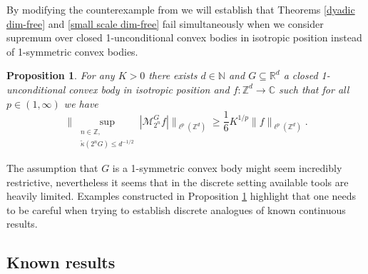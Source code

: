 \documentclass[10pt,a4paper]{amsart}
\numberwithin{equation}{section}
\newtheorem{Prop}[Thm]{Proposition}
\newcommand{\Z}{\mathbb{Z}}
\newcommand{\R}{\mathbb{R}}
\newcommand{\C}{\mathbb{C}}
\newcommand{\N}{\mathbb{N}}
\begin{document}
By modifying the counterexample from \cite[Theorem 2]{cubes} we will establish that Theorems \ref{dyadic dim-free} and \ref{small scale dim-free} fail simultaneously when we consider supremum over closed 1-unconditional convex bodies in isotropic position instead of 1-symmetric convex bodies.
\begin{Prop} \label{counter-example}
    For any $K >0$ there exists $d \in \N$ and $G \subseteq \R^d$ a closed 1-unconditional convex body in isotropic position and $f: \Z^d \to \C$ such that for all $p \in (1, \infty)$ we have
    \[
    \Big\| \sup_{\substack{n \in \Z, \\ \widetilde{\kappa}(2^n G) \le d^{-1/2}}} |\mathcal{M}_{2^n}^G f| \Big\|_{\ell^p(\Z^d)} \ge \frac{1}{6} K^{1/p} \|f \|_{\ell^p(\Z^d)}.
    \]
\end{Prop}


\par The assumption that $G$ is a 1-symmetric convex body might seem incredibly restrictive, nevertheless it seems that in the discrete setting available tools are heavily limited. Examples constructed in Proposition \ref{counter-example} highlight that one needs to be careful when trying to establish discrete analogues of known continuous results.

\subsection{Known results}
\end{document}
